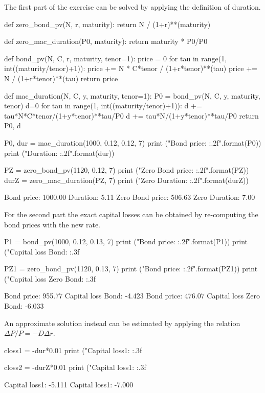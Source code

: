 \cprotEnv\begin{solution}
The first part of the exercise can be solved by applying the definition of duration.
\begin{ipython}
def zero_bond_pv(N, r, maturity):
    return N / (1+r)**(maturity)

def zero_mac_duration(P0, maturity): 
    return maturity * P0/P0 

def bond_pv(N, C, r, maturity, tenor=1):
    price = 0
    for tau in range(1, int((maturity/tenor)+1)):
        price += N * C*tenor / (1+r*tenor)**(tau)
    price += N / (1+r*tenor)**(tau)
    return price

def mac_duration(N, C, y, maturity, tenor=1): 
    P0 = bond_pv(N, C, y, maturity, tenor)
    d=0
    for tau in range(1, int((maturity/tenor)+1)):
        d += tau*N*C*tenor/(1+y*tenor)**tau/P0
    d += tau*N/(1+y*tenor)**tau/P0 
    return P0, d

P0, dur = mac_duration(1000, 0.12, 0.12, 7)
print ("Bond price: {:.2f}".format(P0))
print ("Duration: {:.2f}".format(dur))

PZ = zero_bond_pv(1120, 0.12, 7) 
print ("Zero Bond price: {:.2f}".format(PZ))
durZ = zero_mac_duration(PZ, 7)
print ("Zero Duration: {:.2f}".format(durZ))
\end{ipython}
\begin{ioutput}
Bond price: 1000.00
Duration: 5.11
Zero Bond price: 506.63
Zero Duration: 7.00
\end{ioutput}

For the second part the exact capital losses can be obtained by re-computing the bond prices with the new rate.

\begin{ipython}
P1 = bond_pv(1000, 0.12, 0.13, 7)
print ("Bond price: {:.2f}".format(P1))
print ("Capital loss Bond: {:.3f}%

PZ1 = zero_bond_pv(1120, 0.13, 7) 
print ("Bond price: {:.2f}".format(PZ1))
print ("Capital loss Zero Bond: {:.3f}%
\end{ipython}
\begin{ioutput}
Bond price: 955.77
Capital loss Bond: -4.423%
Bond price: 476.07
Capital loss Zero Bond: -6.033%
\end{ioutput}

An approximate solution instead can be estimated by applying the relation $\Delta P/P = -D\Delta r$.
\begin{ipython}
closs1 = -dur*0.01
print ("Capital loss1: {:.3f}%

closs2 = -durZ*0.01
print ("Capital loss1: {:.3f}%
\end{ipython}
\begin{ioutput}
Capital loss1: -5.111%
Capital loss1: -7.000%
\end{ioutput}
\end{solution}

